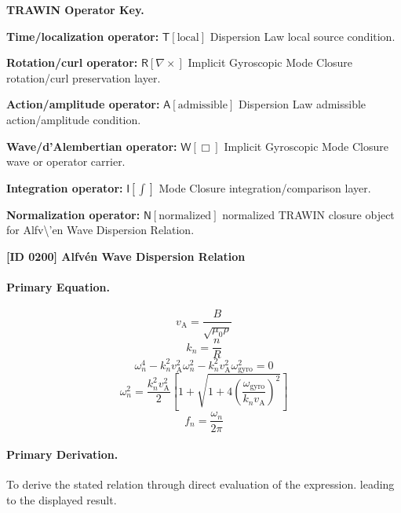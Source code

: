 \par\vspace{0.45\baselineskip}
\noindent\begin{minipage}[t]{\linewidth}
\begingroup
\small
\raggedright
\textbf{TRAWIN Operator Key.}\par
\noindent\textbf{Time/localization operator:} $\mathsf{T}\!\left[\mathrm{local}\right]$ Dispersion Law local source condition.\par
\noindent\textbf{Rotation/curl operator:} $\mathsf{R}\!\left[\nabla\times\right]$ Implicit Gyroscopic Mode Closure rotation/curl preservation layer.\par
\noindent\textbf{Action/amplitude operator:} $\mathsf{A}\!\left[\mathrm{admissible}\right]$ Dispersion Law admissible action/amplitude condition.\par
\noindent\textbf{Wave/d'Alembertian operator:} $\mathsf{W}\!\left[\Box\right]$ Implicit Gyroscopic Mode Closure wave or operator carrier.\par
\noindent\textbf{Integration operator:} $\mathsf{I}\!\left[\int\right]$ Mode Closure integration/comparison layer.\par
\noindent\textbf{Normalization operator:} $\mathsf{N}\!\left[\mathrm{normalized}\right]$ normalized TRAWIN closure object for Alfv\textbackslash{}'en Wave Dispersion Relation.\par
\endgroup
\end{minipage}

\clearpage
\noindent\textbf{[ID 0200] Alfv\'en Wave Dispersion Relation}\par
\vspace{0.35em}
\paragraph{Primary Equation.}
\[
v_{\mathrm{A}} = \frac{B}{\sqrt{\mu_0 \rho}}
\]
\[
k_n=\frac{n}{R}
\]
\[
\omega_n^{4}
-
k_n^{2}v_{\mathrm{A}}^{2}\omega_n^{2}
-
k_n^{2}v_{\mathrm{A}}^{2}\omega_{\mathrm{gyro}}^{2}
=0
\]
\[
\omega_n^2
=
\frac{k_n^2v_{\mathrm{A}}^2}{2}
\left[
1+
\sqrt{
1+
4\left(
\frac{\omega_{\mathrm{gyro}}}{k_nv_{\mathrm{A}}}
\right)^2
}
\right]
\]
\[
f_n=\frac{\omega_n}{2\pi}
\]

\paragraph{Primary Derivation.}
To derive the stated relation through direct evaluation of the expression. leading to the displayed result.
